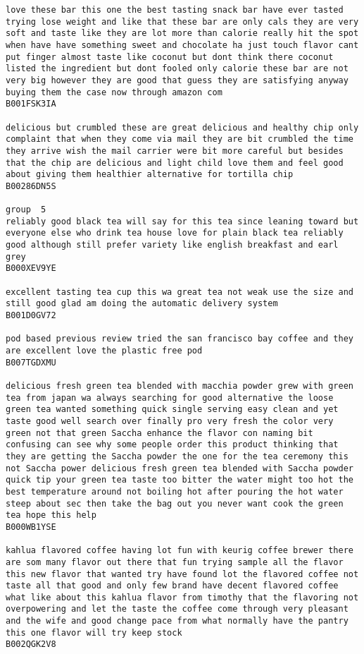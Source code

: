 \documentclass[11pt]{article}
\begin{document}
\begin{Verbatim}[commandchars=\\\{\}]
love these bar this one the best tasting snack bar have ever tasted trying lose weight and like that these bar are only cals they are very soft and taste like they are lot more than calorie really hit the spot when have have something sweet and chocolate ha just touch flavor cant put finger almost taste like coconut but dont think there coconut listed the ingredient but dont fooled only calorie these bar are not very big however they are good that guess they are satisfying anyway buying them the case now through amazon com
B001FSK3IA

delicious but crumbled these are great delicious and healthy chip only complaint that when they come via mail they are bit crumbled the time they arrive wish the mail carrier were bit more careful but besides that the chip are delicious and light child love them and feel good about giving them healthier alternative for tortilla chip
B00286DN5S

group  5
reliably good black tea will say for this tea since leaning toward but everyone else who drink tea house love for plain black tea reliably good although still prefer variety like english breakfast and earl grey
B000XEV9YE

excellent tasting tea cup this wa great tea not weak use the size and still good glad am doing the automatic delivery system
B001D0GV72

pod based previous review tried the san francisco bay coffee and they are excellent love the plastic free pod
B007TGDXMU

delicious fresh green tea blended with macchia powder grew with green tea from japan wa always searching for good alternative the loose green tea wanted something quick single serving easy clean and yet taste good well search over finally pro very fresh the color very green not that green Saccha enhance the flavor con naming bit confusing can see why some people order this product thinking that they are getting the Saccha powder the one for the tea ceremony this not Saccha power delicious fresh green tea blended with Saccha powder quick tip your green tea taste too bitter the water might too hot the best temperature around not boiling hot after pouring the hot water steep about sec then take the bag out you never want cook the green tea hope this help
B000WB1YSE

kahlua flavored coffee having lot fun with keurig coffee brewer there are som many flavor out there that fun trying sample all the flavor this new flavor that wanted try have found lot the flavored coffee not taste all that good and only few brand have decent flavored coffee what like about this kahlua flavor from timothy that the flavoring not overpowering and let the taste the coffee come through very pleasant and the wife and good change pace from what normally have the pantry this one flavor will try keep stock
B002QGK2V8


\end{Verbatim}
\end{document}
